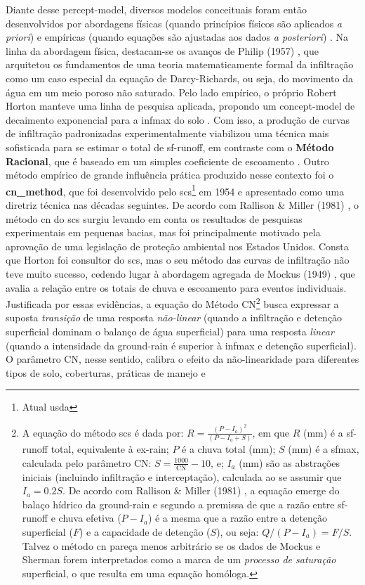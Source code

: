 \documentclass[./main.tex]{subfiles}
\begin{document}
\par Diante desse \gls{percept-model}, diversos modelos conceituais foram então desenvolvidos por abordagens físicas (quando princípios físicos são aplicados \textit{a priori}) e empíricas (quando equações são ajustadas aos dados \textit{a posteriori})  \cite{mishra2003}. Na linha da abordagem física, destacam-se os avanços de Philip (1957) \cite{philip1957}, que arquitetou os fundamentos de uma \gls{teoria} matematicamente formal da infiltração como um caso especial da equação de Darcy-Richards, ou seja, do movimento da água em um meio poroso não saturado. Pelo lado empírico, o próprio Robert Horton manteve uma linha de pesquisa aplicada, propondo um \gls{concept-model} de decaimento exponencial para a \gls{infmax} do solo \cite{Horton1939}. Com isso, a produção de curvas de infiltração padronizadas experimentalmente viabilizou uma técnica mais sofisticada para se estimar o total de \gls{sf-runoff}, em contraste com o \textbf{Método Racional}, que é baseado em um simples coeficiente de escoamento \cite{Cook1946}. Outro método empírico de grande influência prática produzido nesse contexto foi o \textbf{\gls{cn_method}}, que foi desenvolvido pelo \acrfull{scs}\footnote{Atual \acrfull{usda}} em 1954 e apresentado como uma diretriz técnica nas décadas seguintes. De acordo com Rallison \& Miller (1981) \cite{Rallison1981}, o método \acrshort{cn} do \acrshort{scs} surgiu levando em conta os resultados de pesquisas experimentais em pequenas bacias, mas foi principalmente motivado pela aprovação de uma legislação de proteção ambiental nos Estados Unidos. Consta que Horton foi consultor do \acrshort{scs}, mas o seu método das curvas de infiltração não teve muito sucesso, cedendo lugar à abordagem agregada de Mockus (1949) \cite{mockus1949}, que avalia a relação entre os totais de chuva e escoamento para eventos individuais. Justificada por essas evidências, a equação do Método CN\footnote{A equação do método \acrshort{scs} é dada por: $R = \frac{(P - I_a)^{2}}{(P - I_a + S)}$, em que $R$ (mm) é a \gls{sf-runoff} total, equivalente à \gls{ex-rain}; $P$ é a chuva total (mm); $S$ (mm) é a \gls{sfmax}, calculada pelo parâmetro CN: $S = \frac{1000}{\text{CN}}-10$, e; $I_a$ (mm) são as abstrações iniciais (incluindo infiltração e interceptação), calculada ao se assumir que $I_a = 0.2S$. De acordo com Rallison \& Miller (1981) \cite{Rallison1981}, a equação emerge do balaço hídrico da \gls{ground-rain} e segundo a premissa de que a razão entre \gls{sf-runoff} e chuva efetiva ($P - I_a$) é a mesma que a razão entre a detenção superficial ($F$) e a capacidade de detenção ($S$), ou seja: $Q/(P-I_a) = F/S$. Talvez o método \acrshort{cn} pareça menos arbitrário se os dados de Mockus e Sherman forem interpretados como a marca de um \textit{processo de saturação} superficial, o que resulta em uma equação homóloga.} busca expressar a suposta \textit{transição} de uma resposta \textit{não-linear} (quando a infiltração e detenção superficial dominam o balanço de água superficial) para uma resposta \textit{linear} (quando a intensidade da \gls{ground-rain} é superior à \gls{infmax} e detenção superficial). O parâmetro CN, nesse sentido, calibra o efeito da não-linearidade para diferentes tipos de solo, coberturas, práticas de manejo e 
\end{document}
